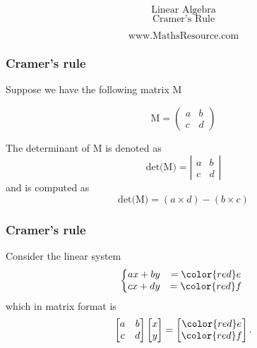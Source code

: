 \documentclass{beamer}
\begin{document}
\begin{frame}
	\Huge
	\[\mbox{Linear Algebra}\]
	\LARGE
	\[\mbox{Cramer's Rule}\]
	
	\Large
	\[\mbox{www.MathsResource.com}\]
\end{frame}

\begin{frame}
\frametitle{Cramer's rule}
\Large

Suppose we have the following matrix M

\[\mbox{M} = \left( \begin{array}{cc}
	a & b \\ 
	c & d
\end{array} \right)
\]

The determinant of M is denoted as 
\[\mbox{det(M)} = \left | \begin{array}{cc}
a & b \\ 
c & d
\end{array} \right |
\]
and is computed as
\[\mbox{det(M)} = (a \times d) - (b \times c)\]

\end{frame}

\begin{frame}
	\frametitle{Cramer's rule}
	\Large
Consider the linear system
\[ \left\{\begin{matrix}ax+by&={\color{red}e}\\ cx + dy&= {\color{red}f}\end{matrix}\right.\  \]which in matrix format is \[ \begin{bmatrix} a & b \\ c & d \end{bmatrix}\begin{bmatrix} x \\ y \end{bmatrix}=\begin{bmatrix} {\color{red}e} \\ {\color{red}f} \end{bmatrix}.\]
\end{frame}
\end{document}
